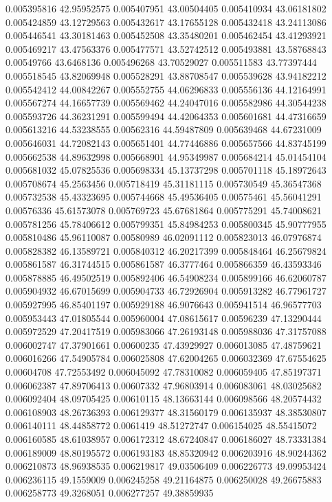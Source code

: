 0.005395816	42.95952575
0.005407951	43.00504405
0.005410934	43.06181802
0.005424859	43.12729563
0.005432617	43.17655128
0.005432418	43.24113086
0.005446541	43.30181463
0.005452508	43.35480201
0.005462454	43.41293921
0.005469217	43.47563376
0.005477571	43.52742512
0.005493881	43.58768843
0.00549766	43.6468136
0.005496268	43.70529027
0.005511583	43.77397444
0.005518545	43.82069948
0.005528291	43.88708547
0.005539628	43.94182212
0.005542412	44.00842267
0.005552755	44.06296833
0.005556136	44.12164991
0.005567274	44.16657739
0.005569462	44.24047016
0.005582986	44.30544238
0.005593726	44.36231291
0.005599494	44.42064353
0.005601681	44.47316659
0.005613216	44.53238555
0.00562316	44.59487809
0.005639468	44.67231009
0.005646031	44.72082143
0.005651401	44.77446886
0.005657566	44.83745199
0.005662538	44.89632998
0.005668901	44.95349987
0.005684214	45.01454104
0.005681032	45.07825536
0.005698334	45.13737298
0.005701118	45.18972643
0.005708674	45.2563456
0.005718419	45.31181115
0.005730549	45.36547368
0.005732538	45.43323695
0.005744668	45.49536405
0.00575461	45.56041291
0.00576336	45.61573078
0.005769723	45.67681864
0.005775291	45.74008621
0.005781256	45.78406612
0.005799351	45.84984253
0.005800345	45.90777955
0.005810486	45.96110087
0.00580989	46.02091112
0.005823013	46.07976874
0.005828382	46.13589721
0.005840312	46.20217399
0.005848464	46.25679824
0.005861587	46.31744515
0.005861587	46.3777464
0.005866359	46.43593346
0.005878885	46.49502519
0.005892406	46.54908234
0.005899166	46.62060787
0.005904932	46.67015699
0.005904733	46.72926904
0.005913282	46.77961727
0.005927995	46.85401197
0.005929188	46.9076643
0.005941514	46.96577703
0.005953443	47.01805544
0.005960004	47.08615617
0.00596239	47.13290444
0.005972529	47.20417519
0.005983066	47.26193148
0.005988036	47.31757088
0.006002747	47.37901661
0.00600235	47.43929927
0.006013085	47.48759621
0.006016266	47.54905784
0.006025808	47.62004265
0.006032369	47.67554625
0.00604708	47.72553492
0.006045092	47.78310082
0.006059405	47.85197371
0.006062387	47.89706413
0.00607332	47.96803914
0.006083061	48.03025682
0.006092404	48.09705425
0.00610115	48.13663144
0.006098566	48.20574432
0.006108903	48.26736393
0.006129377	48.31560179
0.006135937	48.38530807
0.006140111	48.44858772
0.0061419	48.51272747
0.006154025	48.55415072
0.006160585	48.61038957
0.006172312	48.67240847
0.006186027	48.73331384
0.006189009	48.80195572
0.006193183	48.85320942
0.006203916	48.90244362
0.006210873	48.96938535
0.006219817	49.03506409
0.006226773	49.09953424
0.006236115	49.1559009
0.006245258	49.21164875
0.006250028	49.26675883
0.006258773	49.3268051
0.006277257	49.38859935
